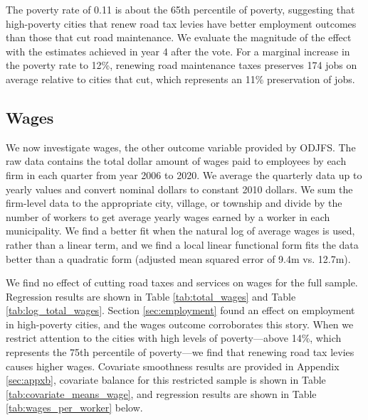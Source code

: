 The poverty rate of 0.11 is about the 65th percentile of poverty, suggesting that high-poverty cities that renew road tax levies have better employment outcomes than those that cut road maintenance.  We evaluate the magnitude of the effect with the estimates achieved in year 4 after the vote.  For a marginal increase in the poverty rate to 12\%, renewing road maintenance taxes preserves 174 jobs on average relative to cities that cut, which represents an 11\% preservation of jobs.

\subsection{Wages}

We now investigate wages, the other outcome variable provided by ODJFS.  The raw data contains the total dollar amount of wages paid to employees by each firm in each quarter from year 2006 to 2020.  We average the quarterly data up to yearly values and convert nominal dollars to constant 2010 dollars.  We sum the firm-level data to the appropriate city, village, or township and divide by the number of workers to get average yearly wages earned by a worker in each municipality.  We find a better fit when the natural log of average wages is used, rather than a linear term, and we find a local linear functional form fits the data better than a quadratic form (adjusted mean squared error of 9.4m vs. 12.7m).

We find no effect of cutting road taxes and services on wages for the full sample.  Regression results are shown in Table \ref{tab:total_wages} and Table \ref{tab:log_total_wages}.  Section \ref{sec:employment} found an effect on employment in high-poverty cities, and the wages outcome corroborates this story. When we restrict attention to the cities with high levels of poverty—above 14\%, which represents the 75th percentile of poverty—we find that renewing road tax levies causes higher wages.  Covariate smoothness results are provided in Appendix \ref{sec:appxb}, covariate balance for this restricted sample is shown in Table \ref{tab:covariate_means_wage}, and regression results are shown in Table \ref{tab:wages_per_worker} below. 

